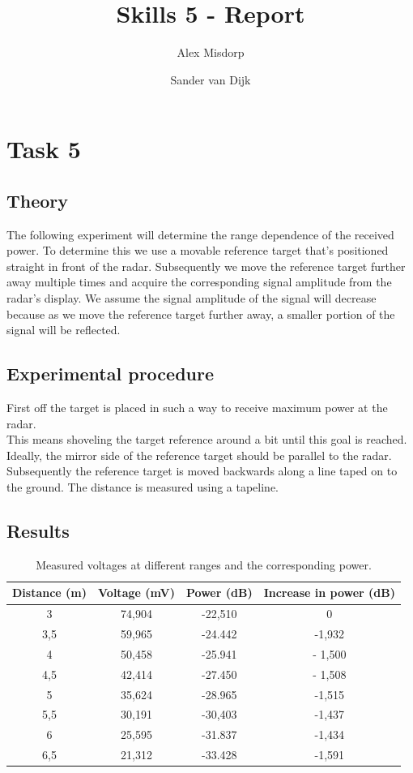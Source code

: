 \documentclass[final]{scrreprt} %
\title{Skills 5 - Report}
\author{Alex {Misdorp} \and Sander {van Dijk}}
\begin{document}
\chapter{Task 5}
\section{Theory}
The following experiment will determine the range dependence of the received power. 
To determine this we use a movable reference target that's positioned straight in front of the radar. 
Subsequently we move the reference target further away multiple times and acquire the corresponding signal amplitude from the radar's display.
We assume the signal amplitude of the signal will decrease because as we move the reference target further away, a smaller portion of the signal will be reflected.

\section{Experimental procedure}
First off the target is placed in such a way to receive maximum power at the radar.\\
This means shoveling the target reference around a bit until this goal is reached.\\
Ideally, the mirror side of the reference target should be parallel to the radar.\\
Subsequently the reference target is moved backwards along a line taped on to the ground.
The distance is measured using a tapeline.

\section{Results}
\begin{table}[H]
\begin{center}
\begin{tabular}{|c | c | c | c|}
\hline
Distance (m) & Voltage (mV) & Power (dB) & Increase in power (dB)\\
\hline
3 & 74,904 & -22,510 & 0\\
\hline
3,5 & 59,965 & -24.442 & -1,932\\
\hline
4 & 50,458 &  -25.941 & - 1,500\\
\hline
4,5 & 42,414 & -27.450 & - 1,508\\
\hline
5 & 35,624 & -28.965 & -1,515\\
\hline
5,5 & 30,191 & -30,403 & -1,437\\
\hline
6 & 25,595 & -31.837 & -1,434\\
\hline
6,5 & 21,312 & -33.428 & -1,591\\
\hline
\end{tabular}
\caption{Measured voltages at different ranges and the corresponding power.}
\label{tab:receivedpower}
\end{center}
\end{table}
\end{document}

